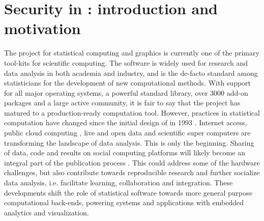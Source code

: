 






\section{Security in \R: introduction and motivation}

The \R project for statistical computing and graphics \citep{R-project} is
currently one of the primary tool-kits for scientific computing. The software is
widely used for research and data analysis in both academia and industry, and is
the de-facto standard among statisticians for the development of new
computational methods. With support for all major operating systems, a powerful
standard library, over 3000 add-on packages and a large active community, it is
fair to say that the project has matured to a production-ready computation tool.
However, practices in statistical computation have changed since the initial
design of \R in 1993 \citep{ihaka1998r}. Internet access, public cloud computing
\citep{armbrust2010view}, live and open data and scientific super computers are
transforming the landscape of data analysis. This is only the beginning. Sharing
of data, code and results on social computing platforms will likely become an
integral part of the publication process \citep{asareport}. This could address
some of the hardware challenges, but also contribute towards reproducible
research and further socialize data analysis, i.e. facilitate learning,
collaboration and integration. These developments shift the role of
statistical software towards more general purpose computational back-ends,
powering systems and applications with embedded analytics and visualization.

